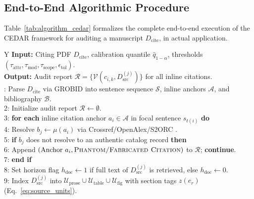 \documentclass[journal]{IEEEtran}
\begin{document}
\subsection{End-to-End Algorithmic Procedure}
Table~\ref{tab:algorithm_cedar} formalizes the complete end-to-end execution of the CEDAR framework for auditing a manuscript $D_{\text{cite}}$, in actual application.

\begin{table}[t]
\centering
\footnotesize
\caption{Algorithm 1: End-to-End CEDAR Citation Verification Procedure}
\label{tab:algorithm_cedar}
\renewcommand{\arraystretch}{1.12}
\begin{tabularx}{\columnwidth}{Y}
\toprule
\textbf{Input:} Citing PDF $D_{\text{cite}}$, calibration quantile $\hat{q}_{1-\alpha}$, thresholds $(\tau_{\text{attr}}, \tau_{\text{mod}}, \tau_{\text{scope}}, \epsilon_{\text{tol}})$. \\
\textbf{Output:} Audit report $\mathcal{R} = \{\mathcal{V}(c_{i,k}, D_{\text{src}}^{(j)})\}$ for all inline citations. \\
: Parse $D_{\text{cite}}$ via GROBID \cite{lopez2009grobid} into sentence sequence $\mathcal{S}$, inline anchors $\mathcal{A}$, and bibliography $\mathcal{B}$. \\
2: Initialize audit report $\mathcal{R} \leftarrow \emptyset$. \\
3: \textbf{for each} inline citation anchor $a_i \in \mathcal{A}$ in focal sentence $s_{t(i)}$ \textbf{do} \\
4: \hspace{0.8em} Resolve $b_j \leftarrow \mu(a_i)$ via Crossref/OpenAlex/S2ORC \cite{lo2020s2orc}. \\
5: \hspace{0.8em} \textbf{if} $b_j$ does not resolve to an authentic catalog record \textbf{then} \\
6: \hspace{1.6em} Append $(\text{Anchor } a_i, \textsc{Phantom/Fabricated Citation})$ to $\mathcal{R}$; \textbf{continue}. \\
7: \hspace{0.8em} \textbf{end if} \\
8: \hspace{0.8em} Set horizon flag $h_{\text{doc}} \leftarrow 1$ if full text of $D_{\text{src}}^{(j)}$ is retrieved, else $h_{\text{doc}} \leftarrow 0$. \\
9: \hspace{0.8em} Index $D_{\text{src}}^{(j)}$ into $\mathcal{U}_{\text{prose}} \cup \mathcal{U}_{\text{table}} \cup \mathcal{U}_{\text{fig}}$ with section tags $z(e_r)$ (Eq.~\ref{eq:source_units}). \\

\end{tabularx}
\end{table}
\end{document}
